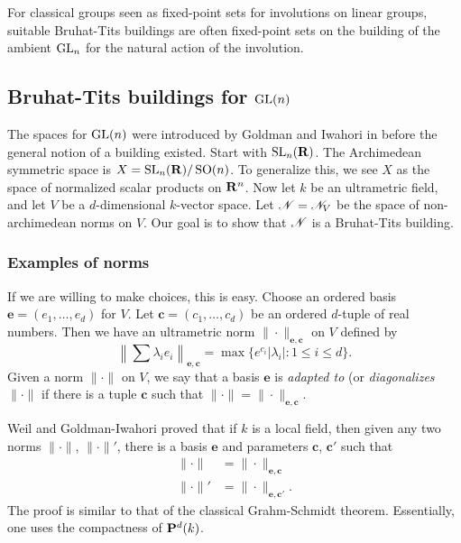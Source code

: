 For classical groups seen as fixed-point sets for involutions on linear 
groups, suitable Bruhat-Tits buildings are often fixed-point sets on 
the building of the ambient $\operatorname{GL}_n$ for the natural action of the 
involution. 










\subsection{Bruhat-Tits buildings for \texorpdfstring{$\operatorname{GL}(n)$}{GL(n)}}\label{sec:gln}

The spaces for $\operatorname{GL}(n)$ were introduced by Goldman and Iwahori 
in \cite{gi63} before the general notion of a building existed. Start with 
$\operatorname{SL}_n(\mathbf{R})$. The Archimedean symmetric space is 
$X=\operatorname{SL}_n(\mathbf{R})/\operatorname{SO}(n)$. To generalize this, we see 
$X$ as the space of normalized scalar products on $\mathbf{R}^n$. Now let $k$ be an 
ultrametric field, and let $V$ be a $d$-dimensional $k$-vector space. Let 
$\mathscr{N}=\mathscr{N}_V$ be the space of non-archimedean norms on $V$. Our goal is to 
show that $\mathscr{N}$ is a Bruhat-Tits building. 


\subsubsection{Examples of norms}

If we are willing to make choices, this is easy. Choose an ordered basis 
$\boldsymbol e=(e_1,\dots,e_d)$ for $V$. Let $\boldsymbol c=(c_1,\dots,c_d)$ be 
an ordered $d$-tuple of real numbers. Then we have an ultrametric norm 
$\|\cdot\|_{\boldsymbol e,\boldsymbol c}$ on $V$ defined by 
\[
  \left\| \sum \lambda_i e_i \right\|_{\boldsymbol e, \boldsymbol c} = \max\{e^{c_i} |\lambda_i|:1\leqslant i\leqslant d\} .
\]
Given a norm $\|\cdot\|$ on $V$, we say that a basis $\boldsymbol e$ is 
\emph{adapted to} (or \emph{diagonalizes} $\|\cdot\|$ if there is a 
tuple $\boldsymbol c$ such that $\|\cdot\|=\|\cdot\|_{\boldsymbol e,\boldsymbol c}$. 

Weil and Goldman-Iwahori proved that if $k$ is a local field, then given 
any two norms $\|\cdot\|$, $\|\cdot\|'$, there is a basis $\boldsymbol e$ and 
parameters $\boldsymbol c$, $\boldsymbol c'$ such that 
\begin{align*}
  \|\cdot\| &= \|\cdot\|_{\boldsymbol e,\boldsymbol c} \\
  \|\cdot\|' &= \|\cdot\|_{\boldsymbol e, \boldsymbol c'} .
\end{align*}
The proof is similar to that of the classical Grahm-Schmidt theorem. Essentially, 
one uses the compactness of $\mathbf{P}^d(k)$. 

